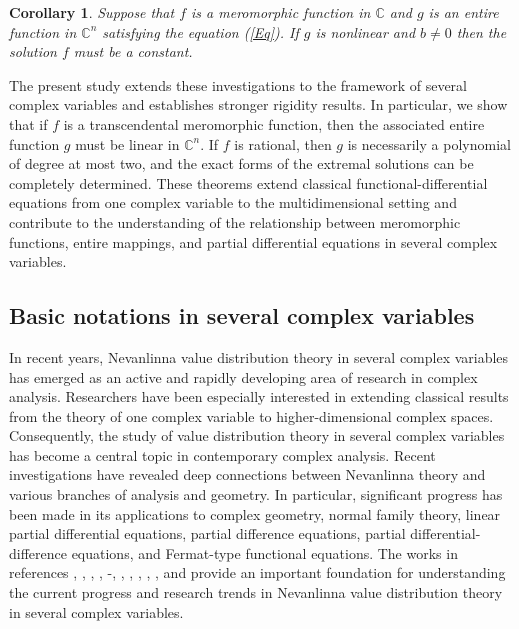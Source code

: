 \documentclass[11pt,reqno]{amsart}
\newtheorem{cor}{Corollary}[section]
\numberwithin{equation}{section}
\begin{document}
\begin{cor}Suppose that $f$ is a meromorphic function in $\mathbb{C}$ and $g$ is an entire function in $\mathbb{C}^n$ satisfying the equation (\ref{Eq}). If $g$ is nonlinear and $b\neq 0$ then the solution $f$ must be a constant.
\end{cor}

The present study extends these investigations to the framework of several complex variables and establishes stronger rigidity results. In particular, we show that if $f$ is a transcendental meromorphic function, then the associated entire function $g$ must be linear in $\mathbb{C}^n$. If $f$ is rational, then $g$ is necessarily a polynomial of degree at most two, and the exact forms of the extremal solutions can be completely determined. These theorems extend classical functional-differential equations from one complex variable to the multidimensional setting and contribute to the understanding of the relationship between meromorphic functions, entire mappings, and partial differential equations in several complex variables.






\subsection{{\bf Basic notations in several complex variables}}
In recent years, Nevanlinna value distribution theory in several complex variables has emerged as an active and rapidly developing area of research in complex analysis. Researchers have been especially interested in extending classical results from the theory of one complex variable to higher-dimensional complex spaces. Consequently, the study of value distribution theory in several complex variables has become a central topic in contemporary complex analysis.
Recent investigations have revealed deep connections between Nevanlinna theory and various branches of analysis and geometry. In particular, significant progress has been made in its applications to complex geometry, normal family theory, linear partial differential equations, partial difference equations, partial differential-difference equations, and Fermat-type functional equations. 
The works in references \cite{Banerjee-Majumder-2026}, \cite{Cao-Korhonen-2016}, \cite{Dovbush-2021}, \cite{Hao-Zhang-2025}, \cite{LY11}-\cite{FL}, \cite{Majumder-2026}, \cite{Majumder-Das}, \cite{Majumder-Das-Pramanik-2025}, \cite{Majumder-Sarkar}, \cite{Majumder-Sarkar-2026}, \cite{Majumder-Sarkar-2027} and \cite{Majumder-Sarkar-Pramanik} provide an important foundation for understanding the current progress and research trends in Nevanlinna value distribution theory in several complex variables.
\end{document}
